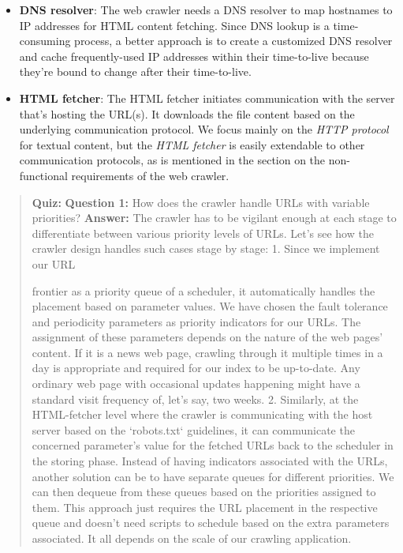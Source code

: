 \begin{itemize}
\item
\protect{}\label{wUyhEGCSbTqDMb6K_6MdP}
\textbf{DNS resolver}: The web crawler needs a DNS resolver to map hostnames to IP addresses for HTML content fetching. Since DNS lookup is a time-consuming process, a better approach is to create a customized DNS resolver and cache frequently-used IP addresses within their time-to-live because they're bound to change after their time-to-live.
\item
\protect{}\label{BacsK7GFPuuvYJ-zNlQGM}
\textbf{HTML fetcher}: The HTML fetcher initiates communication with the server that's hosting the URL(s). It downloads the file content based on the underlying communication protocol. We focus mainly on the \emph{HTTP protocol} for textual content, but the \emph{HTML fetcher} is easily extendable to other communication protocols, as is mentioned in the section on the non-functional requirements of the web crawler.
\end{itemize}

\begin{quote}
\textbf{Quiz:}
\textbf{Question 1:} How does the crawler handle URLs with variable priorities?
\textbf{Answer:} The crawler has to be vigilant enough at each stage to differentiate between various priority levels of URLs. Let's see how the crawler design handles such cases stage by stage: 1. Since we implement our URL

frontier as a priority queue of a scheduler, it automatically handles the placement based on parameter values. We have chosen the fault tolerance and periodicity parameters as priority indicators for our URLs. The assignment of these parameters depends on the nature of the web pages' content. If it is a news web page, crawling through it multiple times in a day is appropriate and required for our index to be up-to-date. Any ordinary web page with occasional updates happening might have a standard visit frequency of, let's say, two weeks. 2.
Similarly, at the HTML-fetcher level where the crawler is communicating with the host server based on the `robots.txt` guidelines, it can communicate the concerned parameter's value for the fetched URLs back to the scheduler in the storing phase. Instead of having indicators associated with the URLs, another solution can be to have separate queues for different priorities. We can then dequeue from these queues based on the priorities assigned to them. This approach just requires the URL placement in the respective queue and doesn't need scripts to schedule based on the extra parameters associated. It all depends on the scale of our crawling application.
\end{quote}

